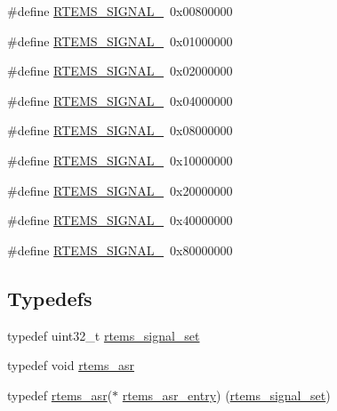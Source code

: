 \begin{DoxyCompactItemize}
\#define \mbox{\hyperlink{group__ClassicASR_ga06837f833462d04fc6b6b3390a575eec}{R\+T\+E\+M\+S\+\_\+\+S\+I\+G\+N\+A\+L\+\_}}~0x00800000
\item 
\#define \mbox{\hyperlink{group__ClassicASR_ga5172f163e3f6e8a4fabe7acd690362d6}{R\+T\+E\+M\+S\+\_\+\+S\+I\+G\+N\+A\+L\+\_}}~0x01000000
\item 
\#define \mbox{\hyperlink{group__ClassicASR_ga262d75b49961687942cce9478f891ee8}{R\+T\+E\+M\+S\+\_\+\+S\+I\+G\+N\+A\+L\+\_}}~0x02000000
\item 
\#define \mbox{\hyperlink{group__ClassicASR_ga8bd377ce75e8b4c628805cbb6e5d3244}{R\+T\+E\+M\+S\+\_\+\+S\+I\+G\+N\+A\+L\+\_}}~0x04000000
\item 
\#define \mbox{\hyperlink{group__ClassicASR_ga2a481a94ae613d313149e5735ecf8191}{R\+T\+E\+M\+S\+\_\+\+S\+I\+G\+N\+A\+L\+\_}}~0x08000000
\item 
\#define \mbox{\hyperlink{group__ClassicASR_gaa2b42b3a13a6eab82bf035ef2f7a5c5d}{R\+T\+E\+M\+S\+\_\+\+S\+I\+G\+N\+A\+L\+\_}}~0x10000000
\item 
\#define \mbox{\hyperlink{group__ClassicASR_gad3446aa558b1c2ba7f2256769f1d1dc1}{R\+T\+E\+M\+S\+\_\+\+S\+I\+G\+N\+A\+L\+\_}}~0x20000000
\item 
\#define \mbox{\hyperlink{group__ClassicASR_gade9ce974b0794bc3fdb49953dd4064d5}{R\+T\+E\+M\+S\+\_\+\+S\+I\+G\+N\+A\+L\+\_}}~0x40000000
\item 
\#define \mbox{\hyperlink{group__ClassicASR_ga0bfe827c59cbf84edf9e4a6a4198e136}{R\+T\+E\+M\+S\+\_\+\+S\+I\+G\+N\+A\+L\+\_}}~0x80000000
\end{DoxyCompactItemize}
\subsection*{Typedefs}
\begin{DoxyCompactItemize}
\item 
typedef uint32\+\_\+t \mbox{\hyperlink{group__ClassicASR_gae494c868e6d04d19b2f403bb51de98eb}{rtems\+\_\+signal\+\_\+set}}
\item 
typedef void \mbox{\hyperlink{group__ClassicASR_gaa19dbf6435861a92292e35cabea675fb}{rtems\+\_\+asr}}
\item 
typedef \mbox{\hyperlink{group__ClassicASR_gaa19dbf6435861a92292e35cabea675fb}{rtems\+\_\+asr}}($\ast$ \mbox{\hyperlink{group__ClassicASR_ga7277136adc52f70cdfd49c687ce37732}{rtems\+\_\+asr\+\_\+entry}}) (\mbox{\hyperlink{group__ClassicASR_gae494c868e6d04d19b2f403bb51de98eb}{rtems\+\_\+signal\+\_\+set}})
\end{DoxyCompactItemize}


